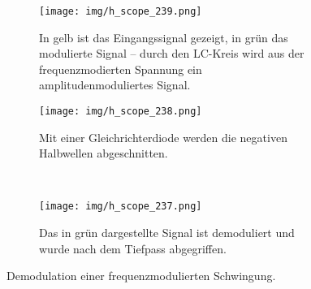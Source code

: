 \begin{figure}[t!]
	\centering
	\begin{subfigure}[t]{0.48\textwidth}
		\centering
		\texttt{[image: img/h\_scope\_239.png]}
		\caption{In gelb ist das Eingangssignal gezeigt, in grün das modulierte Signal -- durch den LC-Kreis wird aus der frequenzmodierten Spannung ein amplitudenmoduliertes Signal.}
		\label{amp}
	\end{subfigure}\hfill%
	\begin{subfigure}[t]{0.48\textwidth}
		\centering
		\texttt{[image: img/h\_scope\_238.png]}
		\caption{Mit einer Gleichrichterdiode werden die negativen Halbwellen abgeschnitten.}
		\label{De-FM}
	\end{subfigure}
	\\
	\begin{subfigure}[t]{0.5\textwidth}
		\centering
		\texttt{[image: img/h\_scope\_237.png]}
		\caption{Das in grün dargestellte Signal ist demoduliert und wurde nach dem Tiefpass abgegriffen.}
		\label{De-FM-RC}
	\end{subfigure}
	\caption{Demodulation einer frequenzmodulierten Schwingung.}
\end{figure}

\FloatBarrier
